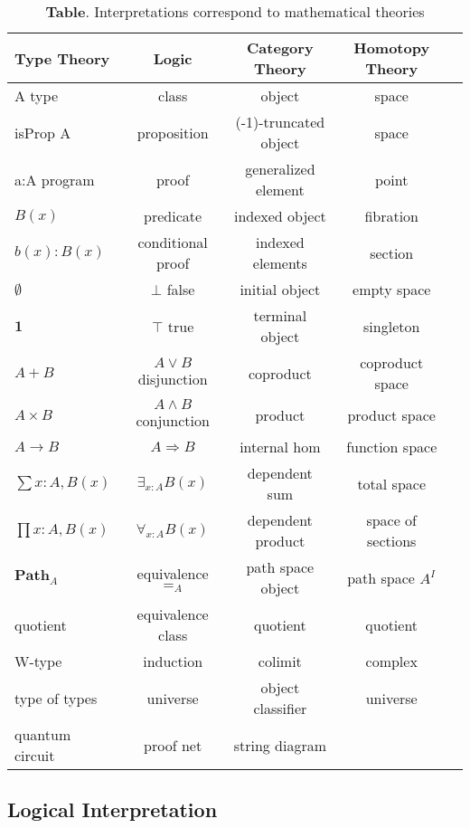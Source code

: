 \documentclass{article}
\theoremstyle{definition}
\begin{document}
\begin{table}[!ht]
  \centering
  \caption*{\textbf{Table}. Interpretations correspond to mathematical theories}
  \begin{adjustbox}{width=\columnwidth,center}
  \begin{tabular}{lcccc}
    \hline
       Type Theory & Logic & Category Theory & Homotopy Theory\\
    \hline
       A type & class & object & space \\
       isProp A & proposition & (-1)-truncated object & space \\
       a:A program & proof & generalized element & point \\
       $B(x)$ & predicate & indexed object & fibration \\
       $b(x) : B(x)$ & conditional proof & indexed elements & section\\
       $\emptyset$ & $\bot$ false & initial object & empty space \\
       $\mathbf{1}$ & $\top$ true & terminal object & singleton \\
       $A + B$ & $A\vee B$ disjunction & coproduct & coproduct space \\
       $A\times B$ & $A\wedge B$ conjunction & product & product space \\
       $A\to B$ & $A\Rightarrow B$ & internal hom & function space \\
       $\sum{x:A},B(x)$ & $\exists_{x:A}B(x)$ & dependent sum & total space \\
       $\prod{x:A},B(x)$ & $\forall_{x:A}B(x)$ & dependent product & space of sections\\
       $\mathbf{Path}_{A}$ & equivalence $=_A$ & path space object & path space $A^I$ \\
       quotient & equivalence class & quotient & quotient \\
       W-type & induction & colimit & complex\\
       type of types & universe & object classifier & universe \\
       quantum circuit & proof net & string diagram & \\
      \hline
  \end{tabular}
  \end{adjustbox}
\end{table}

\subsection{Logical Interpretation}
\end{document}
